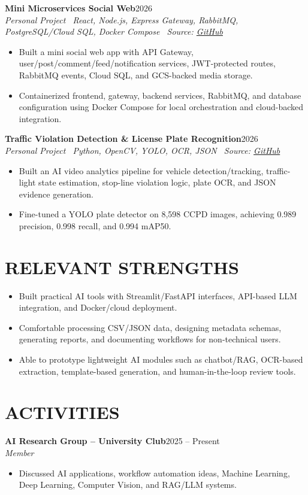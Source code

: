 \documentclass[10pt,a4paper]{article}
\newenvironment{cvitems}{%
    \begin{itemize}[leftmargin=1.1em,itemsep=0pt,topsep=0pt,parsep=0pt]
}{%
    \end{itemize}
}
\newcommand{\entryhead}[2]{%
    \noindent\textbf{#1}\hfill #2\\[-2pt]
}
\newcommand{\entrysub}[1]{%
    \noindent\textit{#1}\\[-1pt]
}
\begin{document}
\entryhead{Mini Microservices Social Web}{2026}
\entrysub{Personal Project \textbar\ React, Node.js, Express Gateway, RabbitMQ, PostgreSQL/Cloud SQL, Docker Compose \textbar\ Source: \href{https://github.com/NguyenKhacBao564/Mini_Microservices_Socail_Web}{GitHub}}
\begin{cvitems}
    \item Built a mini social web app with API Gateway, user/post/comment/feed/notification services, JWT-protected routes, RabbitMQ events, Cloud SQL, and GCS-backed media storage.
    \item Containerized frontend, gateway, backend services, RabbitMQ, and database configuration using Docker Compose for local orchestration and cloud-backed integration.
\end{cvitems}

\entryhead{Traffic Violation Detection \& License Plate Recognition}{2026}
\entrysub{Personal Project \textbar\ Python, OpenCV, YOLO, OCR, JSON \textbar\ Source: \href{https://github.com/NguyenKhacBao564/Traffic-Violation-Detection-and-License-Plate-Recognition}{GitHub}}
\begin{cvitems}
    \item Built an AI video analytics pipeline for vehicle detection/tracking, traffic-light state estimation, stop-line violation logic, plate OCR, and JSON evidence generation.
    \item Fine-tuned a YOLO plate detector on 8,598 CCPD images, achieving 0.989 precision, 0.998 recall, and 0.994 mAP50.
\end{cvitems}

\section{RELEVANT STRENGTHS}
\begin{cvitems}
    \item Built practical AI tools with Streamlit/FastAPI interfaces, API-based LLM integration, and Docker/cloud deployment.
    \item Comfortable processing CSV/JSON data, designing metadata schemas, generating reports, and documenting workflows for non-technical users.
    \item Able to prototype lightweight AI modules such as chatbot/RAG, OCR-based extraction, template-based generation, and human-in-the-loop review tools.
\end{cvitems}

\section{ACTIVITIES}
\entryhead{AI Research Group -- University Club}{2025 -- Present}
\entrysub{Member}
\begin{cvitems}
    \item Discussed AI applications, workflow automation ideas, Machine Learning, Deep Learning, Computer Vision, and RAG/LLM systems.
\end{cvitems}
\end{document}
